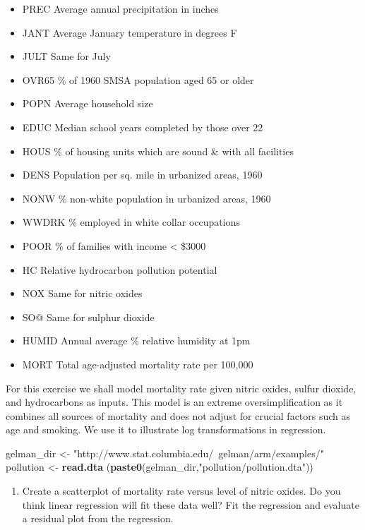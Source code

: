 \documentclass[]{article}
\newenvironment{Shaded}{\begin{snugshade}}{\end{snugshade}}
\newcommand{\KeywordTok}[1]{\textcolor[rgb]{0.13,0.29,0.53}{\textbf{#1}}}
\newcommand{\NormalTok}[1]{#1}
\newcommand{\StringTok}[1]{\textcolor[rgb]{0.31,0.60,0.02}{#1}}
\providecommand{\tightlist}{%
  \setlength{\itemsep}{0pt}\setlength{\parskip}{0pt}}
\begin{document}
\begin{itemize}
\tightlist
\item
  PREC Average annual precipitation in inches
\item
  JANT Average January temperature in degrees F
\item
  JULT Same for July
\item
  OVR65 \% of 1960 SMSA population aged 65 or older
\item
  POPN Average household size
\item
  EDUC Median school years completed by those over 22
\item
  HOUS \% of housing units which are sound \& with all facilities
\item
  DENS Population per sq. mile in urbanized areas, 1960
\item
  NONW \% non-white population in urbanized areas, 1960
\item
  WWDRK \% employed in white collar occupations
\item
  POOR \% of families with income \textless{} \$3000
\item
  HC Relative hydrocarbon pollution potential
\item
  NOX Same for nitric oxides
\item
  SO@ Same for sulphur dioxide
\item
  HUMID Annual average \% relative humidity at 1pm
\item
  MORT Total age-adjusted mortality rate per 100,000
\end{itemize}

For this exercise we shall model mortality rate given nitric oxides,
sulfur dioxide, and hydrocarbons as inputs. This model is an extreme
oversimplification as it combines all sources of mortality and does not
adjust for crucial factors such as age and smoking. We use it to
illustrate log transformations in regression.

\begin{Shaded}
\begin{Highlighting}[]
\NormalTok{gelman_dir   <-}\StringTok{ "http://www.stat.columbia.edu/~gelman/arm/examples/"}
\NormalTok{pollution    <-}\StringTok{ }\KeywordTok{read.dta}\NormalTok{ (}\KeywordTok{paste0}\NormalTok{(gelman_dir,}\StringTok{"pollution/pollution.dta"}\NormalTok{))}
\end{Highlighting}
\end{Shaded}

\begin{enumerate}
\def\labelenumi{\arabic{enumi}.}
\tightlist
\item
  Create a scatterplot of mortality rate versus level of nitric oxides.
  Do you think linear regression will fit these data well? Fit the
  regression and evaluate a residual plot from the regression.
\end{enumerate}
\end{document}
